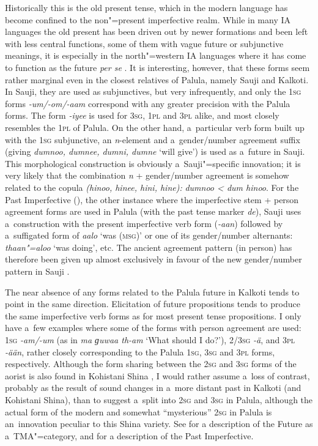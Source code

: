 Historically this is the old present tense, which in the modern language has become confined to the non"=present imperfective realm. While in many IA languages the old present has been driven out by newer formations and been left with less central functions, some of them with vague future or subjunctive meanings, it is especially in the north"=western IA languages where it has come to function as the future \textit{per se} \citep[288]{masica1991}. It is interesting, however, that these forms seem rather marginal even in the closest relatives of Palula, namely Sauji and Kalkoti. In Sauji, they are used as subjunctives, but very infrequently, and only the \textsc{1sg} forms \textit{-um/-om/-aam} correspond with any greater precision with the Palula forms. The form \textit{-iyee} is used for \textsc{3sg}, \textsc{1pl} and \textsc{3pl} alike, and most closely resembles the \textsc{1pl} of Palula. On the other hand, a~particular verb form built up with the \textsc{1sg} subjunctive, an \textit{n}-element and a~gender/number agreement suffix (giving \textit{dumnoo, dumnee, dumni, dumne} `will give') is used as a~future in Sauji. This morphological construction is obviously a~Sauji"=specific innovation; it is very likely that the combination \textit{n} + gender/number agreement is somehow related to the copula \textit{(hinoo, hinee, hini, hine):} \textit{dumnoo {\textless} dum hinoo}. For the Past Imperfective (), the other instance where the imperfective stem + person agreement forms are used in Palula (with the past tense marker \textit{de}), Sauji uses a~construction with the present imperfective verb form (\textit{-aan}) followed by a~suffigated form of \textit{aalo} `was \textsc{(msg)}' or one of its gender/number alternants: \textit{thaan"=aloo} `was doing', etc. The ancient agreement pattern (in person) has therefore been given up almost exclusively in favour of the new gender/number pattern in Sauji \citep[46--54]{buddruss1967}.


\largerpage[-1]
The near absence of any forms related to the Palula future in Kalkoti tends to point in the same direction. Elicitation of future propositions tends to produce the same imperfective verb forms as for most present tense propositions. I only have a~few examples where some of the forms with person agreement are used: \textsc{1sg} \textit{-am/-um} (as in \textit{ma ɡuwaa th-am} `What should I do?'), \textsc{2/3sg} \textit{-ä}, and \textsc{3pl} \textit{-ään}, rather closely corresponding to the Palula \textsc{1sg}, \textsc{3sg} and \textsc{3pl} forms, respectively. Although the form sharing between the \textsc{2sg} and \textsc{3sg} forms of the aorist is also found in Kohistani Shina \citep[39]{schmidt2004}, I would rather assume a~loss of contrast, probably as the result of sound changes in a~more distant past in Kalkoti (and Kohistani Shina), than to suggest a~split into \textsc{2sg} and \textsc{3sg} in Palula, although the actual form of the modern and somewhat ``mysterious'' \textsc{2sg} in Palula is an~innovation peculiar to this Shina variety. See  for a description of the Future as a~TMA"=category, and  for a description of the Past Imperfective.


